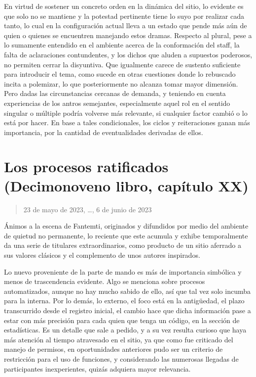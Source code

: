 \documentclass[
]{book}
\begin{document}
En virtud de sostener un concreto orden en la dinámica del sitio, lo evidente es que solo no se mantiene y la potestad pertinente tiene lo suyo por realizar cada tanto, lo cual en la configuración actual lleva a un estado que pende más aún de quien o quienes se encuentren manejando estos dramas. Respecto al plural, pese a lo sumamente entendido en el ambiente acerca de la conformación del staff, la falta de aclaraciones contundentes, y los dichos que aluden a supuestos poderosos, no permiten cerrar la disyuntiva. Que igualmente carece de sustento suficiente para introducir el tema, como sucede en otras cuestiones donde lo rebuscado incita a polemizar, lo que posteriormente no alcanza tomar mayor dimensión. Pero dadas las circunstancias cercanas de demanda, y teniendo en cuenta experiencias de los antros semejantes, especialmente aquel rol en el sentido singular o múltiple podría volverse más relevante, si cualquier factor cambió o lo está por hacer. En base a tales condicionales, los ciclos y reiteraciones ganan más importancia, por la cantidad de eventualidades derivadas de ellos.

\hypertarget{los-procesos-ratificados-decimonoveno-libro-capuxedtulo-xx}{%
\section{Los procesos ratificados (Decimonoveno libro, capítulo XX)}\label{los-procesos-ratificados-decimonoveno-libro-capuxedtulo-xx}}

\begin{quote}
23 de mayo de 2023, \ldots, 6 de junio de 2023
\end{quote}

Ánimos a la escena de Fantemti, originados y difundidos por medio del ambiente de quietud no permanente, lo reciente que este acumula y exhibe temporalmente da una serie de titulares extraordinarios, como producto de un sitio aferrado a sus valores clásicos y el complemento de unos autores inspirados.

Lo nuevo proveniente de la parte de mando es más de importancia simbólica y menos de trascendencia evidente. Algo se menciona sobre procesos automatizados, aunque no hay mucho sabido de ello, así que tal vez solo incumba para la interna. Por lo demás, lo externo, el foco está en la antigüedad, el plazo transcurrido desde el registro inicial, el cambio hace que dicha información pase a estar con más precisión para cada quien que tenga un código, en la sección de estadísticas. Es un detalle que sale a pedido, y a su vez resulta curioso que haya más atención al tiempo atravesado en el sitio, ya que como fue criticado del manejo de permisos, en oportunidades anteriores pudo ser un criterio de restricción para el uso de funciones, y considerando las numerosas llegadas de participantes inexperientes, quizás adquiera mayor relevancia.
\end{document}
